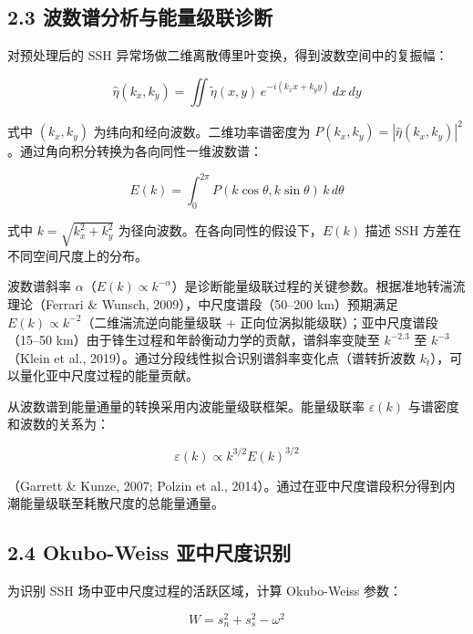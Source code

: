\documentclass[11pt,a4paper]{article}
\begin{document}
\subsection*{2.3  波数谱分析与能量级联诊断}

对预处理后的 SSH 异常场做二维离散傅里叶变换，得到波数空间中的复振幅：

\begin{equation}
\hat{\eta}(k_x, k_y) = \iint \tilde{\eta}(x,y)\, e^{-i(k_x x + k_y y)}\, dx\,dy
\end{equation}

式中 $(k_x, k_y)$ 为纬向和经向波数。二维功率谱密度为 $P(k_x, k_y) = |\hat{\eta}(k_x, k_y)|^2$。通过角向积分转换为各向同性一维波数谱：

\begin{equation}
E(k) = \int_{0}^{2\pi} P(k\cos\theta, k\sin\theta)\, k\, d\theta
\end{equation}

式中 $k = \sqrt{k_x^2 + k_y^2}$ 为径向波数。在各向同性的假设下，$E(k)$ 描述 SSH 方差在不同空间尺度上的分布。\par

波数谱斜率 $\alpha$（$E(k) \propto k^{-\alpha}$）是诊断能量级联过程的关键参数。根据准地转湍流理论（Ferrari \& Wunsch, 2009），中尺度谱段（50--200 km）预期满足 $E(k) \propto k^{-2}$（二维湍流逆向能量级联 + 正向位涡拟能级联）；亚中尺度谱段（15--50 km）由于锋生过程和年龄衡动力学的贡献，谱斜率变陡至 $k^{-2.3}$ 至 $k^{-3}$（Klein et al., 2019）。通过分段线性拟合识别谱斜率变化点（谱转折波数 $k_t$），可以量化亚中尺度过程的能量贡献。\par

从波数谱到能量通量的转换采用内波能量级联框架。能量级联率 $\varepsilon(k)$ 与谱密度和波数的关系为：

\begin{equation}
\varepsilon(k) \propto k^{3/2} E(k)^{3/2}
\end{equation}

（Garrett \& Kunze, 2007; Polzin et al., 2014）。通过在亚中尺度谱段积分得到内潮能量级联至耗散尺度的总能量通量。\par

\subsection*{2.4  Okubo-Weiss 亚中尺度识别}

为识别 SSH 场中亚中尺度过程的活跃区域，计算 Okubo-Weiss 参数：

\begin{equation}
W = s_n^2 + s_s^2 - \omega^2
\end{equation}
\end{document}
